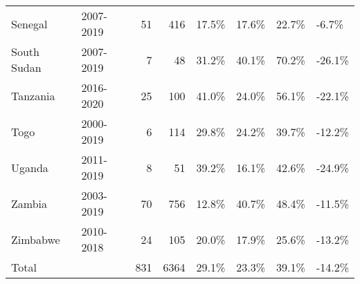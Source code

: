 \begin{table}[ht]
\begin{tabular}{llrrllll}
  Senegal & 2007-2019 &  51 & 416 & 17.5\% & 17.6\% & 22.7\% & -6.7\% \\ 
  South Sudan & 2007-2019 &   7 &  48 & 31.2\% & 40.1\% & 70.2\% & -26.1\% \\ 
  Tanzania & 2016-2020 &  25 & 100 & 41.0\% & 24.0\% & 56.1\% & -22.1\% \\ 
  Togo & 2000-2019 &   6 & 114 & 29.8\% & 24.2\% & 39.7\% & -12.2\% \\ 
  Uganda & 2011-2019 &   8 &  51 & 39.2\% & 16.1\% & 42.6\% & -24.9\% \\ 
  Zambia & 2003-2019 &  70 & 756 & 12.8\% & 40.7\% & 48.4\% & -11.5\% \\ 
  Zimbabwe & 2010-2018 &  24 & 105 & 20.0\% & 17.9\% & 25.6\% & -13.2\% \\ 
  Total &   & 831 & 6364 & 29.1\% & 23.3\% & 39.1\% & -14.2\% \\ 
   \hline
\end{tabular}
\end{table}
